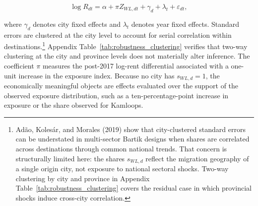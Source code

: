\documentclass[12pt]{article}
\begin{document}
\begin{equation}
\log R_{dt} = \alpha + \pi Z_{WL,dt} + \gamma_d + \lambda_t + \varepsilon_{dt},
\label{eq:main}
\end{equation}

%
%
%
\enlargethispage{3\baselineskip}
where $\gamma_d$ denotes city fixed effects and $\lambda_t$ denotes year fixed
effects. Standard errors are clustered at the city level to account for serial
correlation within destinations.\footnote{Adão, Kolesár, and Morales (2019) show that city-clustered standard errors can be understated in
multi-sector Bartik designs when shares are correlated across destinations
through common national trends. That concern is structurally limited here:
the shares $s_{WL,d}$ reflect the migration geography of a single origin city,
not exposure to national sectoral shocks. Two-way clustering by city and
province in Appendix Table~\ref{tab:robustness_clustering} covers the residual
case in which provincial shocks induce cross-city correlation.}
Appendix Table~\ref{tab:robustness_clustering}
verifies that two-way clustering at the city and province levels does not
materially alter inference. The coefficient $\pi$ measures the post-2017
log-rent differential associated with a one-unit increase in the exposure index.
Because no city has $s_{WL,d}=1$, the economically meaningful objects are
effects evaluated over the support of the observed exposure distribution, such
as a ten-percentage-point increase in exposure or the share observed for
Kamloops.
\end{document}
